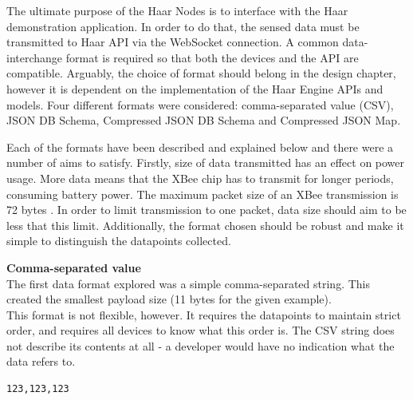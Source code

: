       The ultimate purpose of the Haar Nodes is to interface with the Haar demonstration application. In order to do that, the sensed data must be transmitted to Haar API via the WebSocket connection. A common data-interchange format is required so that both the devices and the API are compatible. Arguably, the choice of format should belong in the design chapter, however it is dependent on the implementation of the Haar Engine APIs and models. Four different formats were considered: comma-separated value (CSV), JSON DB Schema, Compressed JSON DB Schema and Compressed JSON Map.

      Each of the formats have been described and explained below and there were a number of aims to satisfy. Firstly, size of data transmitted has an effect on power usage. More data means that the XBee chip has to transmit for longer periods, consuming battery power. The maximum packet size of an XBee transmission is 72 bytes \citep{xbee-packet-size}. In order to limit transmission to one packet, data size should aim to be less that this limit. Additionally, the format chosen should be robust and make it simple to distinguish the datapoints collected.\\

      \noindent
      \begin{minipage}[t]{0.45\textwidth}
        \textbf{Comma-separated value}\\
        The first data format explored was a simple comma-separated string. This created the smallest payload size (11 bytes for the given example).\\

        This format is not flexible, however. It requires the datapoints to maintain strict order, and requires all devices to know what this order is. The CSV string does not describe its contents at all - a developer would have no indication what the data refers to.\\
      \end{minipage}
      \hfill
      \begin{minipage}[t]{0.45\textwidth}
        \begin{lstlisting}[frame=single]
  123,123,123
        \end{lstlisting}
      \end{minipage}


